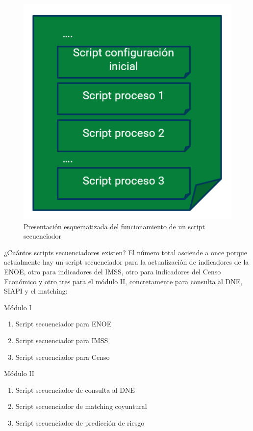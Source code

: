 \documentclass[
]{article}
\begin{document}
\begin{figure}
\includegraphics[width=5.46in]{images-1/02/scriptsecuenciador} \caption{Presentación esquematizada del funcionamiento de un script secuenciador}\label{fig:scriptsecuenciador}
\end{figure}

¿Cuántos scripts secuenciadores existen? El número total asciende a once porque actualmente hay un script secuenciador para la actualización de indicadores de la ENOE, otro para indicadores del IMSS, otro para indicadores del Censo Económico y otro tres para el módulo II, concretamente para consulta al DNE, SIAPI y el matching:

Módulo I

\begin{enumerate}
\def\labelenumi{\arabic{enumi})}
\item
  Script secuenciador para ENOE
\item
  Script secuenciador para IMSS
\item
  Script secuenciador para Censo
\end{enumerate}

Módulo II

\begin{enumerate}
\def\labelenumi{\arabic{enumi})}
\setcounter{enumi}{3}
\item
  Script secuenciador de consulta al DNE
\item
  Script secuenciador de matching coyuntural
\item
  Script secuenciador de predicción de riesgo
\end{enumerate}
\end{document}
